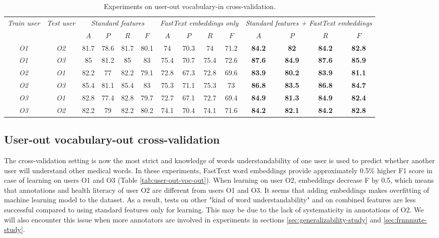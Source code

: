 \begin{table}[h]
\begin{tabular}{cc|cccc|cccc|cccc}
\multirow{2}{0.6cm}{\textit{Train user}} & \multirow{2}{0.6cm}{\textit{Test user}} & \multicolumn{4}{c|}{\textit{Standard features}} & \multicolumn{4}{c|}{\textit{FastText embeddings only}} & \multicolumn{4}{X}{\textit{Standard features + FastText embeddings}} \\ \cline{3-14} 
 &  & $A$ & $P$ & $R$ & $F$ & $A$ & $P$ & $R$ & $F$ & $A$ & $P$ & $R$ & $F$ \\ \hline
\textit{O1} & \textit{O2} & 81.7 & 78.6 & 81.7 & 80.1 & 74 & 70.3 & 74 & 71.2 & \textbf{84.2} & \textbf{82} & \textbf{84.2} & \textbf{82.8} \\  
\textit{O1} & \textit{O3} & 85 & 81.2 & 85 & 83 & 75.4 & 70.7 & 75.4 & 72.6 & \textbf{87.6} & \textbf{84.9} & \textbf{87.6} & \textbf{85.9} \\ \hline 
\textit{O2} & \textit{O1} & 82.2 & 77 & 82.2 & 79.1 & 72.8 & 67.3 & 72.8 & 69.6 & \textbf{83.9} & \textbf{80.2} & \textbf{83.9} & \textbf{81.1} \\  
\textit{O2} & \textit{O3} & 85.4 & 81.1 & 85.4 & 83 & 75.3 & 71.1 & 75.3 & 73 & \textbf{86.8} & \textbf{83.5} & \textbf{86.8} & \textbf{84.7} \\ \hline 
\textit{O3} & \textit{O1} & 82.8 & 77.4 & 82.8 & 79.7 & 72.7 & 67.1 & 72.7 & 69.4 & \textbf{84.9} & \textbf{81.3} & \textbf{84.9} & \textbf{82.4} \\  
\textit{O3} & \textit{O2} & 82.2 & 79 & 82.2 & 80.2 & 74.1 & 70.4 & 74.1 & 71.6 & \textbf{84.2} & \textbf{82.1} & \textbf{84.2} & \textbf{82.8} \\ \hline 
\end{tabular}
    \caption{Experiments on user-out vocabulary-in cross-validation.}
    \label{tab:user-out-voc-in}
\end{table}


\subsection{User-out vocabulary-out cross-validation}
\label{sec:user-out-voc-out}

The cross-validation setting is now the most strict and knowledge of words understandability of one user is used to predict whether another user will understand other medical words. In these experiments, FastText word embeddings provide approximately 0.5\% higher F1 score in case of learning on users O1 and O3 (Table \ref{tab:user-out-voc-out}). When learning on user O2, embeddings decrease F by 0.5, which means that annotations and health literacy of user O2 are different from users O1 and O3. It seems that adding embeddings makes overfitting of machine learning model to the dataset. As a result, tests on other "kind of word understandability" and on combined features are less successful compared to using standard features only for learning. This may be due to the lack of systematicity in annotations of O2. We will also encounter this issue when more annotators are involved in experiments in sections \ref{sec:generalizability-study} and \ref{sec:frnnmute-study}.

